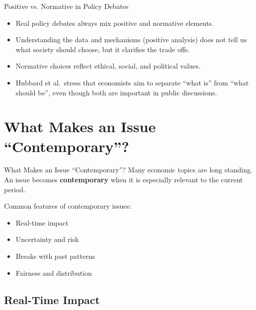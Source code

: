 \documentclass[aspectratio=169]{beamer}
\begin{document}
\begin{frame}{Positive vs. Normative in Policy Debates}
  \transfade
  \begin{itemize}[<+->]
    \item Real policy debates always mix positive and normative elements.
    \item Understanding the data and mechanisms (positive analysis) does not tell us what society
    should choose, but it clarifies the trade offs.
    \item Normative choices reflect ethical, social, and political values.
    \item Hubbard et al.\ stress that economists aim to separate ``what is'' from ``what should be'', even
    though both are important in public discussions.
  \end{itemize}
\end{frame}

\section{What Makes an Issue ``Contemporary''?}

\begin{frame}{What Makes an Issue ``Contemporary''?}
  \transfade
  Many economic topics are long standing. An issue becomes \textbf{contemporary} when it is especially
  relevant to the current period.

  \vspace{0.3cm}
  Common features of contemporary issues:
  \begin{itemize}[<+->]
    \item Real-time impact
    \item Uncertainty and risk
    \item Breaks with past patterns
    \item Fairness and distribution
  \end{itemize}
\end{frame}

\subsection{Real-Time Impact}
\end{document}

